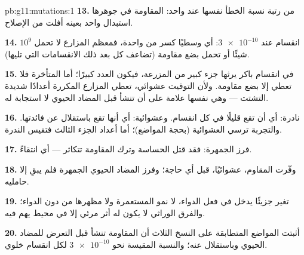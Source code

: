 \begin{solution}{pb:g11:mutations:1}
\textbf{13.} من رتبة نسبة الخطأ نفسها عند  واحد: 
المقاومة في جوهرها استبدال واحد بعينه أفلت من الإصلاح.

\textbf{14.} $10^9$ انقسام عند $\num{3e-10}$: أي وسطيًا كسر من 
واحدة، فمعظم المزارع لا تحمل شيئًا أو تحمل بضع  مقاومة (تضاعف كل
 بعد ذلك الانقسامات التي تليها).

\textbf{15.}  في انقسام باكر يرثها جزء كبير من المزرعة، فيكون
العدد كبيرًا؛ أما المتأخرة فلا تعطي إلا بضع  مقاومة. ولأن التوقيت
عشوائي، تعطي المزارع المكررة أعدادًا شديدة التشتت --- وهي نفسها علامة
على أن  تنشأ قبل المضاد الحيوي لا استجابة له.

\textbf{16.} نادرة: أي أن  تقع قليلًا في كل انقسام. وعشوائية:
أي أنها تقع باستقلال عن فائدتها. والتجربة ترسي العشوائية (بحجة
المواضع)؛ أما أعداد الجزء الثالث فتقيس الندرة.

\textbf{17.} فرز الجمهرة: فقد قتل  الحساسة وترك المقاومة
تتكاثر --- أي انتقاءً.

\textbf{18.} وفّرت   المقاوم، عشوائيًا، قبل أي حاجة؛ وفرز
المضاد الحيوي الجمهرة فلم يبقِ إلا حامليه.

\textbf{19.}  تغير جزيئًا يدخل في فعل الدواء، لا نمو المستعمرة
ولا مظهرها من دون الدواء؛ والفرق الوراثي لا يكون له أثر مرئي إلا في
محيط يهم فيه.

\textbf{20.} أثبتت المواضع المتطابقة على النسخ الثلاث أن 
المقاومة تنشأ قبل التعرض للمضاد الحيوي وباستقلال عنه؛ والنسبة المقيسة
نحو $\num{3e-10}$ لكل انقسام خلوي.
\end{solution}
